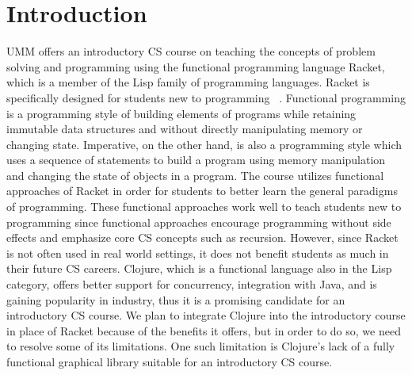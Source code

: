 \documentclass[12pt]{article}
\newcommand{\comment}[1]{}
\newcommand{\emcomment}[1]{\textcolor{ForestGreen}{\comment{Elena: {#1}}}}
\newcommand{\todo}[1]{\textcolor{blue}{\comment{To Do: {#1}}}}
\begin{document}
\newpage
\setcounter{page}{1}

\section{Introduction}\label{sec:intro}
UMM offers an introductory CS course on teaching the concepts of problem solving and programming using the functional programming language Racket, which is a member of the Lisp family of programming languages. Racket is specifically designed for students new to programming ~\cite{htdp}. Functional programming is a programming style of building elements of programs while retaining immutable data structures 
and without directly manipulating memory or changing state. Imperative, on the other hand, is also a programming style which uses a sequence of statements to build a program using memory manipulation and changing the state of objects in a program. 
The course utilizes functional approaches of Racket in order for students to better learn the general paradigms of programming. These functional approaches work well to teach students new to programming since functional approaches encourage programming without side effects and emphasize core CS concepts such as recursion. However, since Racket is not often used in real world settings, it does not benefit students as much in their future CS careers. Clojure, which is a functional language also in the Lisp category, offers better support for concurrency, integration with Java, and is gaining popularity in industry, thus it is a promising candidate for an introductory CS course. We plan to integrate Clojure into the introductory course in place of Racket because of the benefits it offers, but in order to do so, we need to resolve some of its limitations. One such limitation is Clojure's lack of a fully functional graphical library suitable for an introductory CS course. 
\end{document}
